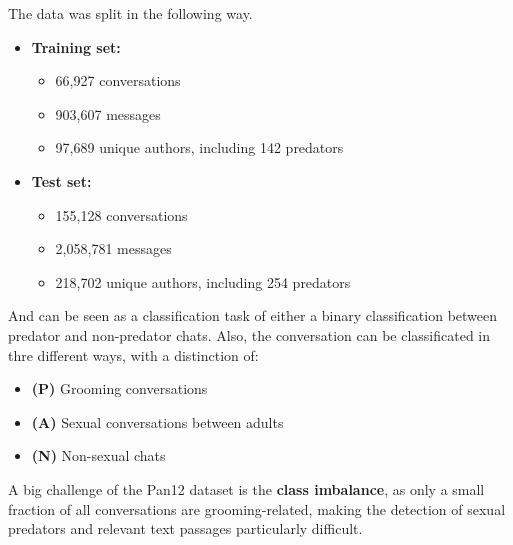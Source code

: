 The data was split in the following way.

\begin{itemize}
    \item \textbf{Training set:}
    \begin{itemize}
        \item 66{,}927 conversations
        \item 903{,}607 messages
        \item 97{,}689 unique authors, including 142 predators
    \end{itemize}
    \item \textbf{Test set:}
    \begin{itemize}
        \item 155{,}128 conversations
        \item 2{,}058{,}781 messages
        \item 218{,}702 unique authors, including 254 predators
    \end{itemize}
\end{itemize}

And can be seen as a classification task of either a binary classification between predator and non-predator chats. Also, the conversation can be classificated in thre different ways, with a distinction of:

\begin{itemize}
    \item \textbf{(P)} Grooming conversations
    \item \textbf{(A)} Sexual conversations between adults
    \item \textbf{(N)} Non-sexual chats
\end{itemize}

A big challenge of the Pan12 dataset is the \textbf{class imbalance}, as only a small fraction of all conversations are grooming-related, making the detection of sexual predators and relevant text passages particularly difficult.



